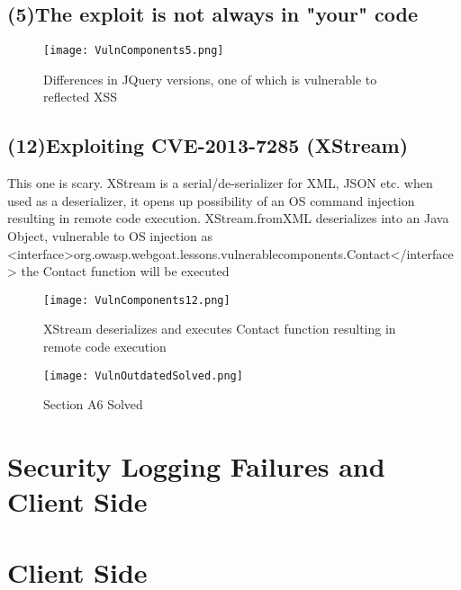 \documentclass[
	letterpaper, %
	10pt, %
	unnumberedsections, %
	twoside, %
]{APAAssignment}
\begin{document}
\begin{appendices}
\subsection{(5)The exploit is not always in "your" code}\label{app:VulnAndOutdatedComponents5}

\begin{figure}[!ht] %
	\centering
	\texttt{[image: VulnComponents5.png]}
	\caption{Differences in JQuery versions, one of which is vulnerable to reflected XSS }
	\label{fig:app:vuln5}
\end{figure}

\subsection{(12)Exploiting CVE-2013-7285 (XStream)}\label{app:VulnAndOutdatedComponents12}
This one is scary. XStream is a serial/de-serializer for XML, JSON etc. when used as a deserializer, it opens up possibility of an OS command injection resulting in remote code execution. XStream.fromXML deserializes into an Java Object, vulnerable to OS injection as <interface>org.owasp.webgoat.lessons.vulnerablecomponents.Contact</interface> the Contact function will be executed   

\begin{figure}[!ht] %
	\centering
	\texttt{[image: VulnComponents12.png]}
	\caption{XStream deserializes and executes Contact function resulting in remote code execution}
	\label{fig:app:vuln12}
\end{figure}


\begin{figure}[!ht] %
	\centering
	\texttt{[image: VulnOutdatedSolved.png]}
	\caption{Section A6 Solved}
	\label{fig:app:vulnSolved}
\end{figure}

\section{Security Logging Failures and Client Side}\label{app:SecurityLogging}



\section{Client Side}\label{app:ClientSide}





\end{appendices}
\end{document}
